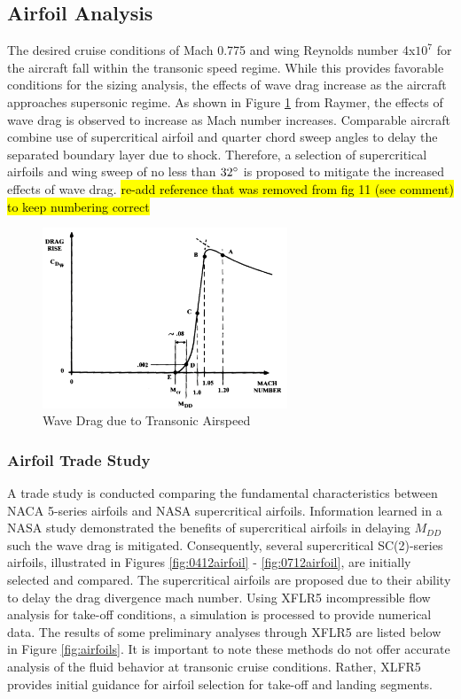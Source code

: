 \subsection{Airfoil Analysis}
The desired cruise conditions of Mach 0.775 and wing Reynolds number 4x$10^7$ for the aircraft fall within the transonic speed regime.  While this provides favorable conditions for the sizing analysis, the effects of wave drag increase as the aircraft approaches supersonic regime.  As shown in Figure \ref{fig:transonic} from Raymer\cite{raymer}, the effects of wave drag is observed to increase as Mach number increases.  Comparable aircraft combine use of supercritical airfoil and quarter chord sweep angles to delay the separated boundary layer due to shock.  Therefore, a selection of supercritical airfoils and wing sweep of no less than $32\degree$ is proposed to mitigate the increased effects of wave drag. \hl{re-add reference that was removed from fig 11 (see comment) to keep numbering correct}

\begin{figure}[!h]
    \centering
    \includegraphics[width=0.65\textwidth]{Photos/wavedragduetotransonic.png}
    \caption{Wave Drag due to Transonic Airspeed}
    \label{fig:transonic}
\end{figure}

\subsubsection{Airfoil Trade Study}
A trade study is conducted comparing the fundamental characteristics between NACA 5-series airfoils and NASA supercritical airfoils.  Information learned in a NASA study \cite{supercritical} demonstrated the benefits of supercritical airfoils in delaying $M_{DD}$ such the wave drag is mitigated.  Consequently, several supercritical SC(2)-series airfoils, illustrated in Figures \ref{fig:0412airfoil} - \ref{fig:0712airfoil}, are initially selected and compared.  The supercritical airfoils are proposed due to their ability to delay the drag divergence mach number.  Using XFLR5 \cite{xflr5} incompressible flow analysis for take-off conditions, a simulation is processed to provide numerical data.  The results of some preliminary analyses through XFLR5 are listed below in Figure \ref{fig:airfoils}.  It is important to note these methods do not offer accurate analysis of the fluid behavior at transonic cruise conditions.  Rather, XLFR5 provides initial guidance for airfoil selection for take-off and landing segments.
\newpage


